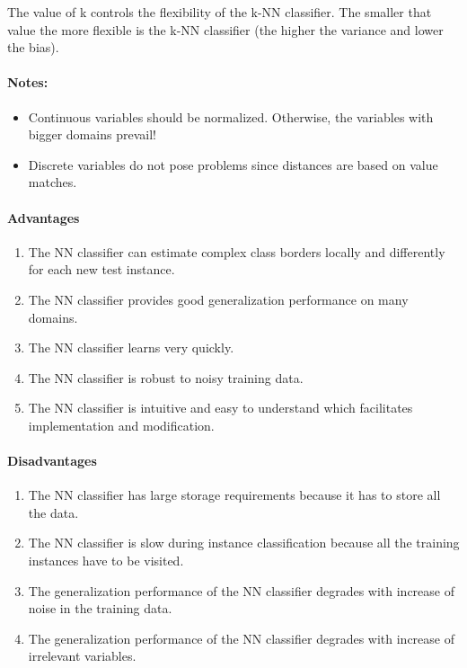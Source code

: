The value of k controls the flexibility of the k-NN classifier. The smaller that value the more flexible is the k-NN classifier (the higher the variance and lower the bias).

\paragraph{Notes:}
\begin{itemize}[noitemsep]
    \item Continuous variables should be normalized. Otherwise, the variables with bigger domains prevail!
    \item Discrete variables do not pose problems since distances are based on value matches.
\end{itemize}

\paragraph{Advantages}
\begin{enumerate}[noitemsep]
    \item The NN classifier can estimate complex class borders locally and differently for each new test instance.
    \item The NN classifier provides good generalization performance on many domains.
    \item The NN classifier learns very quickly.
    \item The NN classifier is robust to noisy training data.
    \item The NN classifier is intuitive and easy to understand which facilitates implementation and modification.
\end{enumerate}

\paragraph{Disadvantages}
\begin{enumerate}[noitemsep]
    \item The NN classifier has large storage requirements because it has to store all the data.
    \item The NN classifier is slow during instance classification because all the training instances have to be visited.
    \item The generalization performance of the NN classifier degrades with increase of noise in the training data.
    \item The generalization performance of the NN classifier degrades with increase of irrelevant variables.
\end{enumerate}

